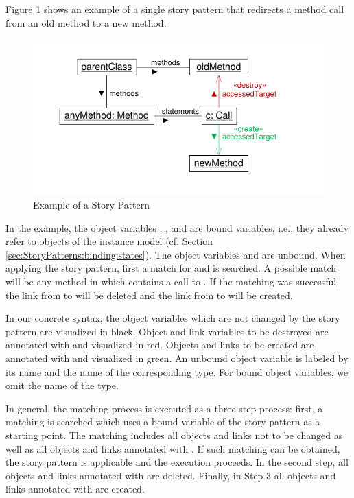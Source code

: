 Figure \ref{fig:simpleStoryPattern} shows an example of a single story pattern that redirects a method call from an old method to a new method.

\begin{figure}[htbp]
  \centering
  \includegraphics[scale=1.0]{figures/SimpleStoryPattern}
  \caption{Example of a Story Pattern}
  \label{fig:simpleStoryPattern}
\end{figure}

In the example, the object variables , , and  are bound variables, i.e., they already refer to objects of the instance model (cf. Section \ref{sec:StoryPatterns:binding:states}).
The object variables  and  are unbound. 
When applying the story pattern, first a match for  and  is searched. 
A possible match will be any method in  which contains a call to . 
If the matching was successful, the link from  to  will be deleted and the link from  to  will be created.

In our concrete syntax, the object variables which are not changed by the story pattern are visualized in black. 
Object and link variables to be destroyed are annotated with \destroy and visualized in red. 
Objects and links to be created are annotated with \create and visualized in green. 
An unbound object variable is labeled by its name and the name of the corresponding type. 
For bound object variables, we omit the name of the type.

In general, the matching process is executed as a three step process:
first, a matching is searched which uses a bound variable of the story pattern as a starting point. 
The matching includes all objects and links not to be changed as well as all objects and links annotated with \destroy. 
If such matching can be obtained, the story pattern is applicable and the execution proceeds. 
In the second step, all objects and links annotated with \destroy are deleted. 
Finally, in Step 3 all objects and links annotated with \create are created.


